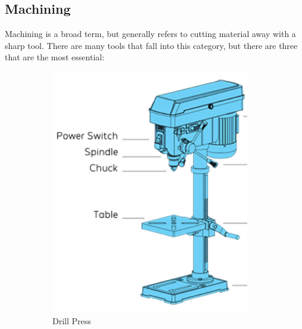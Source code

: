 \documentclass[10pt,letterpaper]{book}
\begin{document}
 \subsection{Machining}
 
 Machining is a broad term, but generally refers to cutting material away with a sharp tool. There are many tools that fall into this category, but there are three that are the most essential:
 
 \begin{figure}[H]
	\centering
	\begin{subfigure}[b]{.24\linewidth}
		\includegraphics[width=0.95\textwidth]{imgs/drillpress.png}
		\caption{Drill Press}
	\end{subfigure}	\begin{subfigure}[b]{.34\linewidth}

\end{subfigure}
\end{figure}
\end{document}
